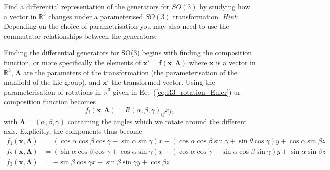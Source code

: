 \documentclass[notes.tex]{subfiles}
\begin{document}
\begin{Exercise}[difficulty={2},label=ex:SO2_diff_generators]
Find a differential representation of the generators for $SO(3)$ by studying how a vector in $\mathbb R^3$ changes under a parameterised $SO(3)$ transformation. {\it Hint}: Depending on the choice of parametrisation you may also need to use the commutator relationships between the generators.
\end{Exercise}
\begin{Answer}
Finding the differential generators for SO(3) begins with finding the composition function, or more specifically the elements of $\mathbf  x'=\mathbf f(\mathbf x, \boldsymbol \Lambda)$ where $\mathbf x$ is a vector in $\mathbb{R}^3$, $\boldsymbol \Lambda$ are the parameters of the transformation (the parameterisation of the manifold of the Lie group), and $\mathbf  x'$ the transformed vector. Using the parameterisation of rotations in $\mathbb{R}^3$ given in Eq.~(\ref{eq:R3_rotation_Euler}) ur composition function becomes 
$$f_i(\mathbf  x,\boldsymbol \Lambda) = R(\alpha,\beta,\gamma)_{ij} x_j,$$ 
with $\boldsymbol\Lambda= (\alpha,\beta,\gamma)$ containing the angles which we rotate around the different axis. Explicitly, the components thus become
\begin{align}
f_1(\mathbf  x,\boldsymbol \Lambda) &= (\cos\alpha\cos\beta\cos\gamma - \sin\alpha\sin\gamma)x - (\cos\alpha\cos\beta\sin\gamma+\sin\theta\cos\gamma)y + \cos\alpha\sin\beta z \\
f_2(\mathbf  x,\boldsymbol\Lambda) &= (\sin\alpha\cos\beta\cos\gamma + \cos\alpha\sin\gamma)x + (\cos\alpha\cos\gamma-\sin\alpha\cos\beta\sin\gamma)y + \sin\alpha\sin\beta z\\
f_3(\mathbf  x,\boldsymbol\Lambda) &= -\sin\beta\cos\gamma x + \sin\beta\sin\gamma y + \cos\beta z
\end{align}


\end{Answer}
\end{document}
